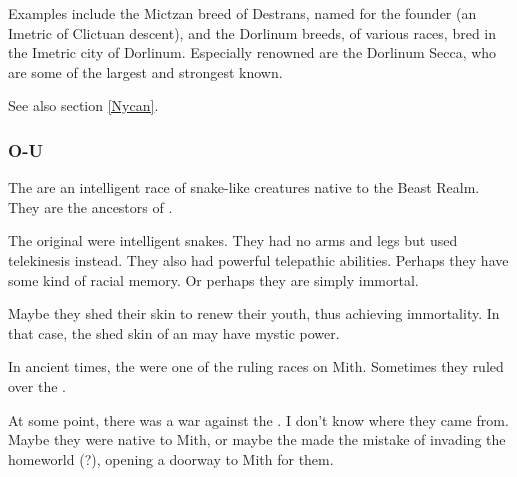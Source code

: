 \label{Mictzan}
Examples include the Mictzan breed of Destrans, named for the founder (an Imetric \scatha{} of Clictuan descent), and the Dorlinum breeds, of various races, bred in the Imetric city of Dorlinum. Especially renowned are the Dorlinum Secca, who are some of the largest and strongest \nycans{} known. 

See also section \ref{Nycan}.
\also{\nycaneer}



\subsubsection{O-U}

\gitempl{\Ophidian}{\Ophidians}


The \ophidians{} are an intelligent race of snake-like creatures native to the Beast Realm. They are the ancestors of \dragons. 

The original \ophidians{} were intelligent snakes. They had no arms and legs but used telekinesis instead. They also had powerful telepathic abilities. Perhaps they have some kind of racial memory. Or perhaps they are simply immortal. 

Maybe they shed their skin to renew their youth, thus achieving immortality. In that case, the shed skin of an \ophidian{} may have mystic power. 

In ancient times, the \ophidians{} were one of the ruling races on Mith. Sometimes they ruled over the \nephilim. 

At some point, there was a war against the \thzantzais. I don't know where they came from. Maybe they were native to Mith, or maybe the \ophidians{} made the mistake of invading the \thzantzaic{} homeworld (\Machai?), opening a doorway to Mith for them. 

